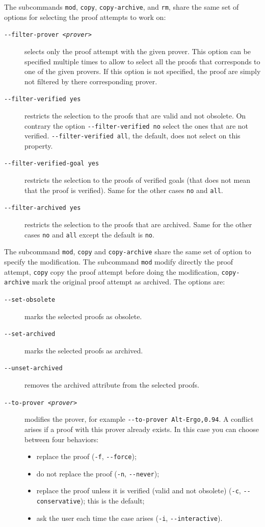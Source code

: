 The subcommands \texttt{mod}, \texttt{copy}, \texttt{copy-archive},
and \texttt{rm}, share the same set of options for selecting the proof
attempts to work on:
\begin{description}
\item[\texttt{-{}-filter-prover \textsl{<prover>}}] selects only the proof attempt with
  the given prover. This option can be specified multiple times to
  allow to select all the proofs that corresponds to one of the given
  provers. If this option is not specified, the proof are simply not
  filtered by there corresponding prover.
\item[\texttt{-{}-filter-verified yes}] restricts the selection to
  the proofs that are valid and not obsolete. On contrary the option
  \verb|--filter-verified no| select the ones that are not verified.
  \verb|--filter-verified all|, the default, does not select on this property.
\item[\texttt{-{}-filter-verified-goal yes}] restricts the selection
  to the proofs of verified goals (that does not mean that the proof is
  verified). Same for the other cases \verb|no| and \verb|all|.
\item[\texttt{-{}-filter-archived yes}] restricts the selection
  to the proofs that are archived.
  Same for the other cases \verb|no|
  and \verb|all| except the default is \verb|no|.
\end{description}

\noindent
The subcommand \texttt{mod}, \texttt{copy} and \texttt{copy-archive}
share the same set of option to specify the modification. The
subcommand \texttt{mod} modify directly the proof attempt,
\texttt{copy} copy the proof attempt before doing the modification,
\texttt{copy-archive} mark the original proof attempt as
archived.
The options are:
\begin{description}
\item[\texttt{-{}-set-obsolete}] marks the selected proofs as
  obsolete.
\item[\texttt{-{}-set-archived}] marks the selected proofs as archived.
\item[\texttt{-{}-unset-archived}] removes the archived attribute
  from the selected proofs.
\item[\texttt{-{}-to-prover \textsl{<prover>}}] modifies the prover, for example
  \texttt{-{}-to-prover Alt-Ergo,0.94}. A conflict arises if a proof
  with this prover already exists. In this case you can choose between four
  behaviors:
\begin{itemize}
\item replace the proof (\verb|-f|, \verb|--force|);
\item do not replace the proof (\verb|-n|, \verb|--never|);
\item replace the proof unless it is verified (valid and not
  obsolete) (\verb|-c|, \verb|--conservative|); this is the default;
\item ask the user each time the case arises (\verb|-i|, \verb|--interactive|).
\end{itemize}
\end{description}


